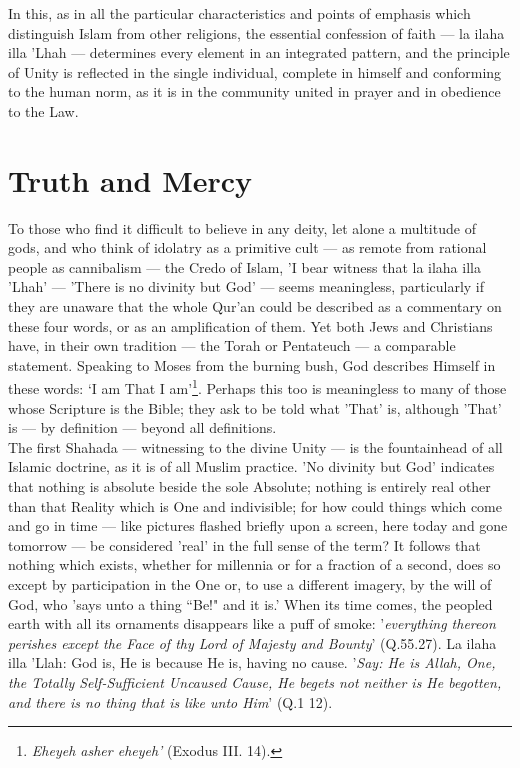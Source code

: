 \documentclass[10pt, twoside]{book}
\begin{document}
In this, as in all the particular characteristics and points of emphasis which distinguish Islam from 
other religions, the essential confession of faith --- la ilaha illa 'Lhah --- determines every element 
in an integrated pattern, and the principle of Unity is reflected in the single individual, complete 
in himself and conforming to the human norm, as it is in the community united in prayer and in 
obedience to the Law. \\

\chapter{Truth and Mercy}

To those who find it difficult to believe in any deity, let alone a multitude of gods, and who think 
of idolatry as a primitive cult --- as remote from rational people as cannibalism --- the Credo of Islam, 
'I bear witness that la ilaha illa 'Lhah' --- 'There is no divinity but God' --- seems meaningless, 
particularly if they are unaware that the whole Qur'an could be described as a commentary on these 
four words, or as an amplification of them. Yet both Jews and Christians have, in their own tradition 
--- the Torah or Pentateuch --- a comparable statement. Speaking to Moses from the burning bush, God 
describes Himself in these words: `I am That I am'\footnote{\emph{Eheyeh asher eheyeh'} (Exodus III. 14).}. Perhaps this too is meaningless to many of those whose Scripture is the Bible; they ask to be told what 'That' is, although 'That' is --- by definition --- beyond all definitions. \\

The first Shahada --- witnessing to the divine Unity --- is the fountainhead of all Islamic doctrine, as 
it is of all Muslim practice. 'No divinity but God' indicates that nothing is absolute beside the 
sole Absolute; nothing is entirely real other than that Reality which is One and indivisible; for how 
could things which come and go in time --- like pictures flashed briefly upon a screen, here today and 
gone tomorrow --- be considered 'real' in the full sense of the term? It follows that nothing which 
exists, whether for millennia or for a fraction of a second, does so except by participation in the 
One or, to use a different imagery, by the will of God, who 'says unto a thing ``Be!" and it is.' When 
its time comes, the peopled earth with all its ornaments disappears like a puff of smoke: '\emph{everything thereon perishes except the Face of thy Lord of Majesty and Bounty}' (Q.55.27). La ilaha illa 'Llah: God is, He is because He is, having no cause. '\emph{Say: He is Allah, One, the Totally Self\hyp{}Sufficient Uncaused Cause, He begets not neither is He begotten, and there is no thing that is like unto Him}' (Q.1 12). \\
\end{document}

